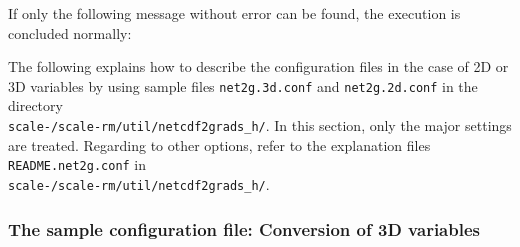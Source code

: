 If only the following message without error can be found, the execution is concluded normally:

The following explains how to describe the configuration files in the case of 2D or 3D variables
by using sample files \verb|net2g.3d.conf| and \verb|net2g.2d.conf| in the directory\\
\texttt{scale-\version/scale-rm/util/netcdf2grads\_h/}.
In this section, only the major settings are treated.
Regarding to other options, refer to the explanation files \verb|README.net2g.conf| in \\
\texttt{scale-\version/scale-rm/util/netcdf2grads\_h/}.

\subsubsection{The sample configuration file: Conversion of 3D variables}

